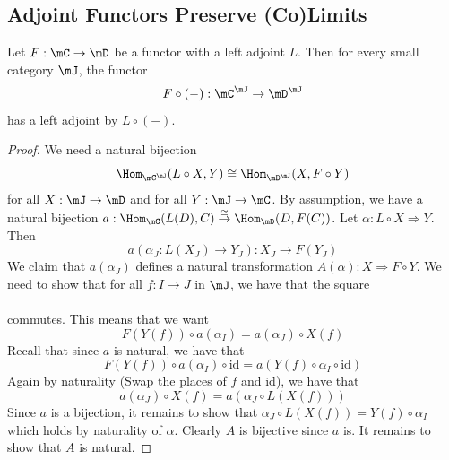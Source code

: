\documentclass[a4paper]{article}
\begin{document}
\subsection{Adjoint Functors Preserve (Co)Limits}
\begin{lmm}{}{} Let $F:\mC\to\mD$ be a functor with a left adjoint $L$. Then for every small category $\mJ$, the functor $$F\circ(-):\mC^\mJ\to\mD^\mJ$$ has a left adjoint by $L\circ(-)$. 
\begin{proof}
We need a natural bijection $$\Hom_{\mC^\mJ}(L\circ X,Y)\cong\Hom_{\mD^\mJ}(X,F\circ Y)$$ for all $X:\mJ\to\mD$ and for all $Y:\mJ\to\mC$. By assumption, we have a natural bijection $a:\Hom_\mC(L(D),C)\overset{\cong}{\to}\Hom_\mD(D,F(C))$. Let $\alpha:L\circ X\Rightarrow Y$. Then $$a(\alpha_J:L(X_J)\to Y_J):X_J\to F(Y_J)$$ We claim that $a(\alpha_J)$ defines a natural transformation $A(\alpha):X\Rightarrow F\circ Y$. We need to show that for all $f:I\to J$ in $\mJ$, we have that the square \\
 \\
commutes. This means that we want $$F(Y(f))\circ a(\alpha_I)=a(\alpha_J)\circ X(f)$$ Recall that since $a$ is natural, we have that $$F(Y(f))\circ a(\alpha_I)\circ\text{id}=a(Y(f)\circ\alpha_I\circ\text{id})$$ Again by naturality (Swap the places of $f$ and $\text{id}$), we have that $$a(\alpha_J)\circ X(f)=a(\alpha_J\circ L(X(f)))$$ Since $a$ is a bijection, it remains to show that $\alpha_J\circ L(X(f))=Y(f)\circ\alpha_I$ which holds by naturality of $\alpha$. Clearly $A$ is bijective since $a$ is. It remains to show that $A$ is natural. 
\end{proof}
\end{lmm}
\end{document}
